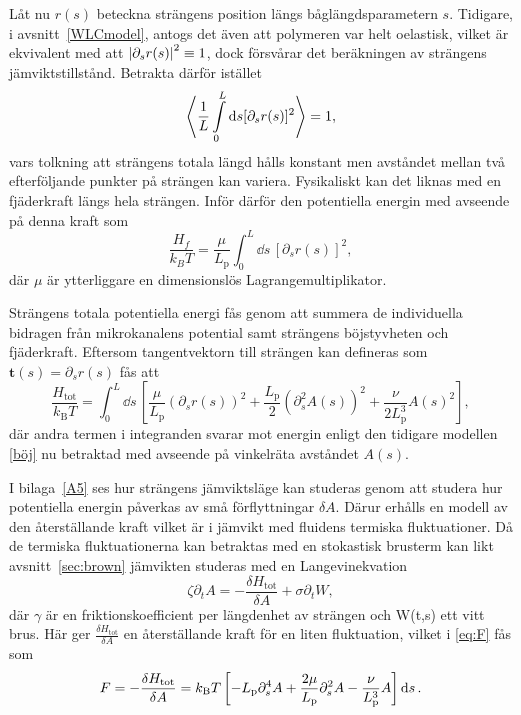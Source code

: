 Låt nu $r(s)$ beteckna strängens position längs båglängdsparametern $s$. Tidigare, i avsnitt~\ref{WLCmodel}, antogs det även att polymeren var helt oelastisk, vilket är ekvivalent med att $\abs{\partial_{s}r(s)}^2\equiv1$, dock försvårar det beräkningen av strängens jämviktstillstånd. Betrakta därför istället \cite{Harnau&Reineker1999}
\begin{equation}\label{jäm2}
\ev{\frac{1}{L}\int_{0}^{L}\dd s[\partial_{s}r(s)]^2}=1,
\end{equation}
vars tolkning att strängens totala längd hålls konstant men avståndet mellan två efterföljande punkter på strängen kan variera. Fysikaliskt kan det liknas med en fjäderkraft längs hela strängen. Inför därför den potentiella energin med avseende på denna kraft som
\begin{equation}
\frac{H_{f}}{k_{B}T}=\frac{\mu}{L_\text{p}}\int_{0}^{L}\dd s\,[\partial_{s}r(s)]^{2},
\end{equation}
där $\mu$ är ytterliggare en dimensionslös Lagrangemultiplikator.

Strängens totala potentiella energi fås genom att summera de individuella bidragen från mikrokanalens potential samt strängens böjstyvheten och fjäderkraft. Eftersom tangentvektorn till strängen kan defineras som $\mathbf{t}(s)=\partial_{s}r(s)$ fås att
\begin{equation}
\label{Htot}
    \frac{H_\text{tot}}{k_{\text{B}}T}=\int_{0}^{L}\!\dd{s}\,\left[\frac{\mu}{L_\text{p}}(\partial_{s}r(s))^{2}+\frac{L_\text{p}}{2}(\partial_{s}^{2}A(s))^2 + \frac{\nu}{2L_\text{p}^3} A(s)^2\right],
\end{equation}
där andra termen i integranden svarar mot energin enligt den tidigare modellen \eqref{böj} nu betraktad med avseende på vinkelräta avståndet $A(s)$.

I bilaga~\ref{A5} ses hur strängens jämviktsläge kan studeras genom att studera hur potentiella energin påverkas av små förflyttningar $\delta A$. Därur erhålls en modell av den återställande kraft vilket är i jämvikt med fluidens termiska fluktuationer. Då de termiska fluktuationerna kan betraktas med en stokastisk brusterm kan likt avsnitt~\ref{sec:brown} jämvikten studeras med en Langevinekvation \cite{Bullerjahn2011}
\begin{equation}\label{mikrokanel}
\zeta\partial_{t}A=-\frac{\delta H_\text{tot}}{\delta A}+\sigma\partial_{t}W,
\end{equation}
där $\gamma$ är en friktionskoefficient per längdenhet av strängen och W(t,s) ett vitt brus. 
Här ger $\frac{\delta H_\text{tot}}{\delta A}$ en återställande kraft för en liten fluktuation, vilket i \eqref{eq:F} fås som 
\begin{equation}
F=-\frac{\delta H_\text{tot}}{\delta A} = k_{\text{B}}T\left[-L_\text{p}\partial_s^4A+\frac{2\mu}{L_\text{p}}\partial_s^2A-\frac{\nu}{L_\text{p}^3}A \right]\dd{s} .
\end{equation}


